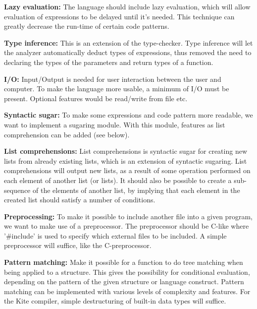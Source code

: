 \textbf{Lazy evaluation:}
The language should include lazy evaluation, which will allow evaluation of expressions to be delayed until it's needed. This technique can greatly decrease the run-time of certain code patterns.

\textbf{Type inference:}
This is an extension of the type-checker. Type inference will let the analyzer automatically deduct types of expressions, thus removed the need to declaring the types of the parameters and return types of a function.

\textbf{I/O:}
Input/Output is needed for user interaction between the user and computer. To make the language more usable, a minimum of I/O must be present. Optional features would be read/write from file etc.

\textbf{Syntactic sugar:}
To make some expressions and code pattern more readable, we want to implement a sugaring module. With this module, features as list comprehension can be added (see below).

\textbf{List comprehensions:}
List comprehensions is syntactic sugar for creating new lists from already existing lists, which is an extension of syntactic sugaring. List comprehensions will output new lists, as a result of some operation performed on each element of another list (or lists). It should also be possible to create a sub-sequence of the elements of another list, by implying that each element in the created list should satisfy a number of conditions.

\textbf{Preprocessing:}
To make it possible to include another file into a given program, we want to make use of a preprocessor. The preprocessor should be C-like where '\#include' is used to specify which external files to be included. A simple preprocessor will suffice, like the C-preprocessor.

\textbf{Pattern matching:}
Make it possible for a function to do tree matching when being applied to a structure. This gives the possibility for conditional evaluation, depending on the pattern of the given structure or language construct. Pattern matching can be implemented with various levels of complexity and features. For the Kite compiler, simple destructuring of built-in data types will suffice.